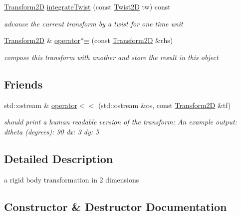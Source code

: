 \begin{DoxyCompactItemize}
\hyperlink{classrigid2d_1_1Transform2D}{Transform2D} \hyperlink{classrigid2d_1_1Transform2D_ae8b441ce0be1b5ea4176f81fe596e5a5}{integrate\+Twist} (const \hyperlink{structrigid2d_1_1Twist2D}{Twist2D} tw) const
\begin{DoxyCompactList}\small\item\em advance the current transform by a twist for one time unit \end{DoxyCompactList}\item 
\hyperlink{classrigid2d_1_1Transform2D}{Transform2D} \& \hyperlink{classrigid2d_1_1Transform2D_ab8ae83c47e43afdcc0b2bcca0ae34fb7}{operator$\ast$=} (const \hyperlink{classrigid2d_1_1Transform2D}{Transform2D} \&rhs)
\begin{DoxyCompactList}\small\item\em compose this transform with another and store the result in this object \end{DoxyCompactList}\end{DoxyCompactItemize}
\subsection*{Friends}
\begin{DoxyCompactItemize}
\item 
std\+::ostream \& \hyperlink{classrigid2d_1_1Transform2D_ad5239a3fa3a0f9cebd73c39f34c2075f}{operator$<$$<$} (std\+::ostream \&os, const \hyperlink{classrigid2d_1_1Transform2D}{Transform2D} \&tf)
\begin{DoxyCompactList}\small\item\em should print a human readable version of the transform\+: An example output\+: dtheta (degrees)\+: 90 dx\+: 3 dy\+: 5 \end{DoxyCompactList}\end{DoxyCompactItemize}


\subsection{Detailed Description}
a rigid body transformation in 2 dimensions 

\subsection{Constructor \& Destructor Documentation}
\mbox{\label{classrigid2d_1_1Transform2D_ab3e595da2315ed50ba8eb24ead0c8d78}} 

